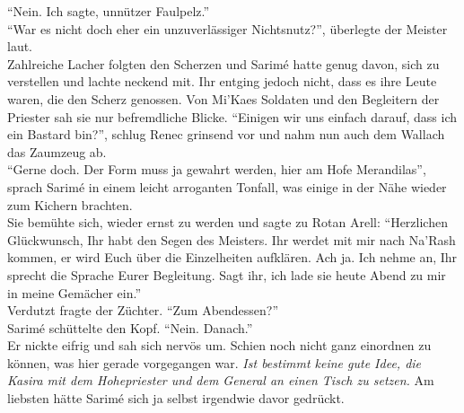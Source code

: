 ``Nein. Ich sagte, unnützer Faulpelz.''\\
``War es nicht doch eher ein unzuverlässiger Nichtsnutz?'', überlegte der Meister laut.\\
Zahlreiche Lacher folgten den Scherzen und Sarimé hatte genug davon, sich zu verstellen und lachte 
neckend mit. Ihr entging jedoch nicht, dass es ihre Leute waren, die den Scherz genossen. Von 
Mi'Kaes Soldaten und den Begleitern der Priester sah sie nur befremdliche Blicke. ``Einigen wir uns 
einfach darauf, dass ich ein Bastard bin?'', schlug Renec grinsend vor und nahm nun auch dem Wallach 
das Zaumzeug ab.\\
``Gerne doch. Der Form muss ja gewahrt werden, hier am Hofe Merandilas'', sprach Sarimé in einem 
leicht arroganten Tonfall, was einige in der Nähe wieder zum Kichern brachten.\\
Sie bemühte sich, wieder ernst zu werden und sagte zu Rotan Arell: ``Herzlichen Glückwunsch, Ihr 
habt den Segen des Meisters. Ihr werdet mit mir nach Na'Rash kommen, er wird Euch über die 
Einzelheiten aufklären. Ach ja. Ich nehme an, Ihr sprecht die Sprache Eurer Begleitung. Sagt ihr, 
ich lade sie heute Abend zu mir in meine Gemächer ein.''\\
Verdutzt fragte der Züchter. ``Zum Abendessen?''\\
Sarimé schüttelte den Kopf. ``Nein. Danach.''\\
Er nickte eifrig und sah sich nervös um. Schien noch nicht ganz einordnen zu können, was hier 
gerade vorgegangen war. \textit{Ist bestimmt keine gute Idee, die Kasira mit dem Hohepriester und 
dem General an einen Tisch zu setzen.} Am liebsten hätte Sarimé sich ja selbst irgendwie davor 
gedrückt.\\

